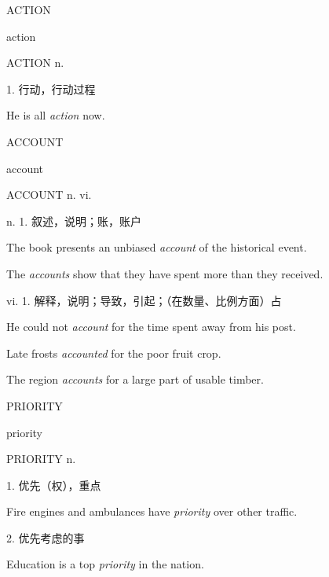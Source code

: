 \begin{flashcard}{
ACTION

action
}
\begin{center}
ACTION n. 
\end{center}
1. 行动，行动过程

He is all \textit{action} now.

\end{flashcard}
\begin{flashcard}{
ACCOUNT

account
}
\begin{center}
ACCOUNT n. vi. 
\end{center}
\normalsize n. 1. 叙述，说明；账，账户

\footnotesize The book presents an unbiased \textit{account} of the historical event.

\footnotesize The \textit{accounts} show that they have spent more than they received.

\normalsize vi. 1. 解释，说明；导致，引起；（在数量、比例方面）占

\footnotesize He could not \textit{account} for the time spent away from his post.

\footnotesize Late frosts \textit{accounted} for the poor fruit crop.

\footnotesize The region \textit{accounts} for a large part of usable timber.

\end{flashcard}
\begin{flashcard}{
PRIORITY

priority
}
\begin{center}
PRIORITY n. 
\end{center}
1. 优先（权），重点

Fire engines and ambulances have \textit{priority} over other traffic.

2. 优先考虑的事

Education is a top \textit{priority} in the nation.

\end{flashcard}
